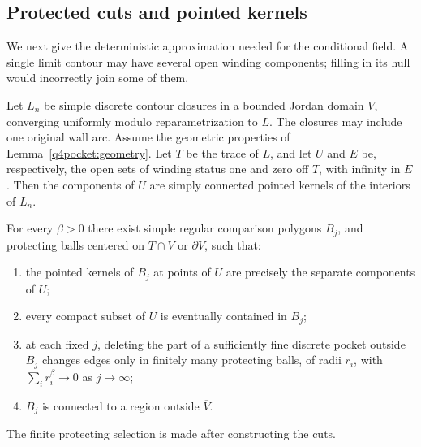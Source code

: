 \subsection{Protected cuts and pointed kernels}

We next give the deterministic approximation needed for the conditional
field.  A single limit contour may have several open winding components;
filling in its hull would incorrectly join some of them.

\begin{lemma}
\label{q4pocket:protected-cuts}
Let $L_n$ be simple discrete contour closures in a bounded Jordan
domain $V$, converging uniformly modulo reparametrization to $L$.
The closures may include one original wall arc.  Assume the geometric
properties of Lemma~\ref{q4pocket:geometry}.  Let $T$ be the trace
of $L$, and let $U$ and $E$ be, respectively, the open sets of winding
status one and zero off $T$, with infinity in $E$.  Then the
components of $U$ are simply connected pointed kernels of the
interiors of $L_n$.

For every $\beta>0$ there exist simple regular comparison polygons
$B_j$, and protecting balls centered on $T\cap V$ or $\partial V$,
such that:
\begin{enumerate}[label=\textup{(\roman*)}]
\item the pointed kernels of $B_j$ at points of $U$ are precisely
the separate components of $U$;
\item every compact subset of $U$ is eventually contained in $B_j$;
\item at each fixed $j$, deleting the part of a sufficiently fine
discrete pocket outside $B_j$ changes edges only in finitely many
protecting balls, of radii $r_i$, with
$\sum_i r_i^\beta\longrightarrow0$ as $j\to\infty$;
\item $B_j$ is connected to a region outside $\overline V$.
\end{enumerate}
The finite protecting selection is made after constructing the cuts.
\end{lemma}

